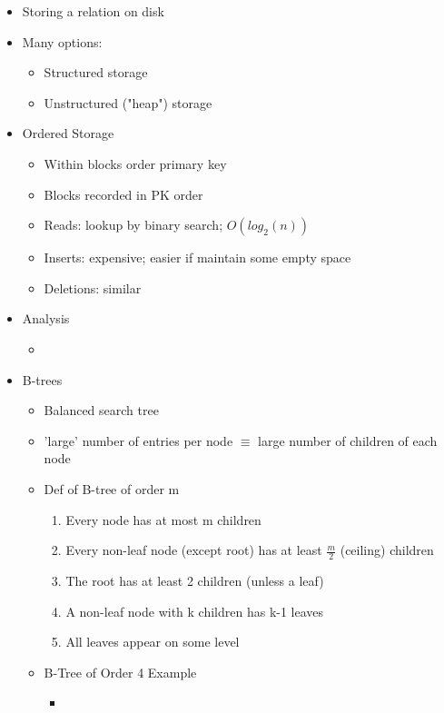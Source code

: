 \documentclass[12pt]{article}
\begin{document}
		\begin{itemize}
			\item
				Storing a relation on disk
			\item
				Many options:
			\begin{itemize}
				\item
					Structured storage
				\item
					Unstructured ("heap") storage
			\end{itemize}
			\item
				Ordered Storage
				\begin{itemize}
					\item
						Within blocks order primary key
					\item
						Blocks recorded in PK order
					\item
						Reads: lookup by binary search; $O(log_2(n))$
					\item
						Inserts: expensive; easier if maintain some empty space
					\item
						Deletions: similar
				\end{itemize}
			\item
				Analysis
				\begin{itemize}
					\item
				\end{itemize}
			\item
				B-trees
				\begin{itemize}
					\item
						Balanced search tree
					\item
						'large' number of entries per node $\equiv$ large number of children of each node
					\item
						Def of B-tree of order m
						\begin{enumerate}
							\item
								Every node has at most m children
							\item
								Every non-leaf node (except root) has at least $\frac{m}{2}$ (ceiling) children
							\item
								The root has at least 2 children (unless a leaf)
							\item
								A non-leaf node with k children has k-1 leaves
							\item
								All leaves appear on some level
						\end{enumerate}
					\item
						B-Tree of Order 4 Example
						\begin{itemize}
							\item
								
						\end{itemize}
				\end{itemize}
		\end{itemize}
\end{document}
